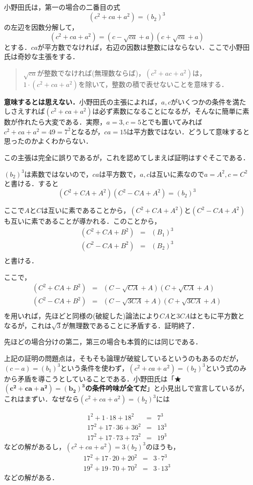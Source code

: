 小野田氏は，第一の場合の二番目の式
\[(c^2+ca+a^2)=(b_2)^3\]
の左辺を因数分解して，
\[(c^2+ca+a^2)=(c-\sqrt{ca}+a)(c+\sqrt{ca}+a)\]
とする．$ca$が平方数でなければ，右辺の因数は整数にはならない．ここで小野田氏は奇妙な主張をする．

\begin{quote}
$\sqrt{ca}$が整数でなければ(無理数ならば)，$(c^2+ac+a^2)$は，$1\cdot (c^2+ca+a^2)$を除いて，整数の積で表せないことを意味する．
\end{quote}

\textbf{意味するとは思えない．}小野田氏の主張によれば，$a,c$がいくつかの条件を満たしさえすれば$(c^2+ca+a^2)$は必ず素数になることになるが，そんなに簡単に素数が作れたら大変である．実際，$a=3,c=5$とでも置いてみれば$c^2+ca+a^2=49=7^2$となるが，$ca=15$は平方数ではない．どうして意味すると思ったのかよくわからない．

この主張は完全に誤りであるが，これを認めてしまえば証明はすぐそこである．

$(b_2)^3$は素数ではないので，$ca$は平方数で，$a,c$は互いに素なので$a=A^2,c=C^2$と書ける．すると
\[(C^2+CA+A^2)(C^2-CA+A^2)=(b_2)^3\]

ここで$A$と$C$は互いに素であることから，$(C^2+CA+A^2)$と$(C^2-CA+A^2)$も互いに素であることが導かれる．このことから，
\begin{eqnarray*}
(C^2+CA+B^2)&=&(B_1)^3\\
(C^2-CA+B^2)&=&(B_2)^3\\
\end{eqnarray*}
と書ける．

ここで，
\begin{eqnarray*}
(C^2+CA+B^2)&=&(C-\sqrt{CA}+A)(C+\sqrt{CA}+A)\\
(C^2-CA+B^2)&=&(C-\sqrt{3CA}+A)(C+\sqrt{3CA}+A)\\
\end{eqnarray*}
を用いれば，先ほどと同様の(破綻した)論法により$CA$と$3CA$はともに平方数となるが，これは$\sqrt{3}$が無理数であることに矛盾する．証明終了．

先ほどの場合分けの第二，第三の場合も本質的には同じである．


上記の証明の問題点は，そもそも論理が破綻しているというのもあるのだが，$(c-a)=(b_1)^3$という条件を使わず，$(c^2+ca+a^2)=(b_2)^3$という式のみから矛盾を導こうとしていることである．小野田氏は「★$\mathbf{(c^2+ca+a^2)=(b_2)^3}$\textbf{の条件吟味が全てだ}」と小見出しで宣言しているが，これはまずい．なぜなら$(c^2+ca+a^2)=(b_2)^3$には

\begin{eqnarray*}
1^2+1\cdot 18+ 18^2&=&7^3\\
17^2+17\cdot 36+ 36^2&=&13^3\\
17^2+17\cdot 73+ 73^2&=&19^3
\end{eqnarray*}
などの解があるし，$(c^2+ca+a^2)=3(b_2)^3$のほうも，
\begin{eqnarray*}
17^2+17\cdot 20+ 20^2&=&3\cdot 7^3\\
19^2+19\cdot 70+ 70^2&=&3\cdot 13^3
\end{eqnarray*}
などの解がある．


